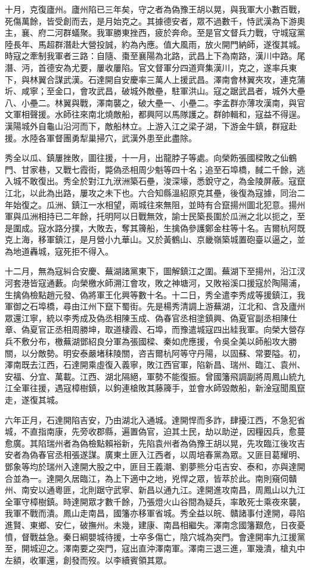 \begin{pinyinscope}
十月，克復廬州。廬州陷已三年矣，守之者為偽豫王胡以晃，與我軍大小數百戰，死傷萬餘，皆受創而去，是月始克之。其據德安者，眾不過數千，恃武漢為下游奧主，襄、府二河群蟻聚。我軍勝東挫西，疲於奔命。至是官文督兵力戰，守城寇黨陸長年、馬超群潛赴大營投誠，約為內應。值大風雨，放火開門納師，遂復其城。時寇之牽制我軍者三路：自隨、棗至襄陽為北路，武昌上下為南路，漢川中路。尾潛、沔，首德安為尤要，屢收屢陷。官文督軍分四道齊集漢川，克之，遂率兵東下，與林翼合謀武漢。石達開自安慶率三萬人上援武昌。澤南會林翼夾攻，連克蒲圻、咸寧；至金口，會攻武昌，破城外敵壘，駐軍洪山。寇之踞武昌者，城外大壘八、小壘二。林翼與戰，澤南襲之，破大壘一、小壘二。李孟群亦薄攻漢南，與官文軍相聲援。水師往來南北燒敵船，都興阿以馬隊護之。群帥輯和，寇益不得逞。漢陽城外自龜山沿河而下，敵船林立。上游入江之梁子湖，下游金牛鎮，群寇赴援。水陸各軍督團勇犁巢掃穴，武漢外患至此盡除。

秀全以瓜、鎮屢挫敗，圖往援，十一月，出龍脖子等處。向榮飭張國樑敗之仙鶴門、甘家巷，又戰七霞街，斃偽丞相周少魁等四十名；追至石埠橋，馘二千餘，逃入城不敢復出。秀全於對江九洑洲築石壘，浚深壕，悉銳守之，為金陵屏蔽。寇竄江北，以此為出路，屢攻之未下也。六合知縣溫紹原克其壘，後復為寇據，同治二年始復之。瓜洲、鎮江一水相望，兩城往來無阻，並時有合竄揚州圖北犯意。揚州軍與瓜洲相持已二年餘，托明阿以日戰無效，諭士民築長圍於瓜洲之北以扼之，至是圍成。寇水路分撲，大敗去，奪其簰船，生擒偽參護鄭金柱等十名。吉爾杭阿既克上海，移軍鎮江，是月營小九華山。又於黃鶴山、京畿嶺築城置砲臺以逼之，並為地道轟城，寇死拒不得入。

十二月，無為寇糾合安慶、蕪湖諸黨東下，圖解鎮江之圍。蕪湖下至揚州，沿江汊河套港皆寇通藪。向榮檄水師溯江會攻，敗之神塘河，又敗裕溪口援寇於陶陽浦，生擒偽檢點趙元發、偽將軍王化興等數十名。十二日，秀全遣李秀成等援鎮江，我軍御之石埠橋，尋由江州下竄下蜀街。先是楊秀清調上游蕪湖，江北和、含及廬州眾還江寧，統以李秀成及偽丞相陳玉成、偽春官丞相塗鎮興、偽夏官副丞相陳仕章、偽夏官正丞相周勝坤，取道棲霞、石埠，而豫遣城寇四出絓我軍。向榮大營存兵不敷分布，檄蕪湖鄧紹良分軍為張國樑、秦如虎應援，令吳全美以師船攻大勝關，以分敵勢。明安泰嚴堵秣陵關，咨吉爾杭阿等守丹陽，以固蘇、常要隘。初，澤南既去江西，石達開乘虛復入義寧，敗江西官軍，陷新昌、瑞州、臨江、袁州、安福、分宜、萬載。江西、湖北隔絕，軍勢不能復振。曾國籓飛調副將周鳳山統九江全軍往援，遇寇樟樹鎮，以鉤連槍敗其藤簰手，並會水師毀敵船，新淦寇聞風竄走，遂復其城。

六年正月，石達開陷吉安，乃由湖北入通城。達開悍而多詐，肆擾江西，不急犯省城，不直指南康，先旁收郡縣，遍置偽官，迫其土民，劫以助逆，因糧因兵，愈蔓愈廣。其陷瑞州者為偽檢點賴裕新，先陷袁州者為偽豫王胡以晃，先攻臨江後攻吉安者為偽春官丞相張遂謀。廣東土匪入江西者，以周培春黨為眾。又匪目葛耀明、鄧象等均於瑞州入達開大股之中，匪目王義潮、劉夢熊分屯吉安、泰和，亦與達開合並為一。達開久居臨江，為上下適中之地，兇悍之眾，皆萃於此。南則窺伺贛州、南安以通粵匪，北則踞守武寧、新昌以通九江。達開進攻南昌，周鳳山以九江全軍守樟樹鎮。時達開眾才數千餘，乃張燈火山谷間為疑兵，率敢死士乘夜來襲，我軍不戰而潰。鳳山走南昌，國籓亦移軍省城。秀全益以皖、贛諸事付達開，尋陷進賢、東鄉、安仁，破撫州。未幾，建康、南昌相繼失。澤南念國籓艱危，日夜憂憤，督戰益急。秦日綱嬰城待援，士卒多傷亡，陰穴城為突門。會達開率九江援黨至，開城迎之。澤南要之突門，寇出直沖澤南軍。澤南三退三進，軍幾潰，槍丸中左額，收軍還，創發而歿。以李續賓領其眾。


\end{pinyinscope}
